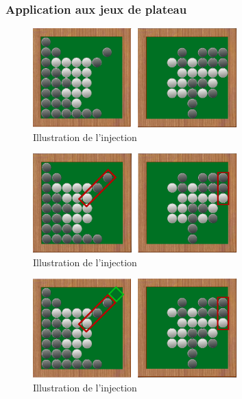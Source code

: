 \subsubsection{Application aux jeux de plateau}

\begin{figure}[H] 
\begin{center}
\includegraphics[width=0.7\textwidth]{files/raisonneur/cbs_reco0} 
\end{center}
\caption{Illustration de l'injection} 
\label{img_cbs_reco0}
\end{figure}

\begin{figure}[H] 
\begin{center}
\includegraphics[width=0.7\textwidth]{files/raisonneur/cbs_reco1} 
\end{center}
\caption{Illustration de l'injection} 
\label{img_cbs_reco1}
\end{figure}

\begin{figure}[H] 
\begin{center}
\includegraphics[width=0.7\textwidth]{files/raisonneur/cbs_reco2} 
\end{center}
\caption{Illustration de l'injection} 
\label{img_cbs_reco2}
\end{figure}

